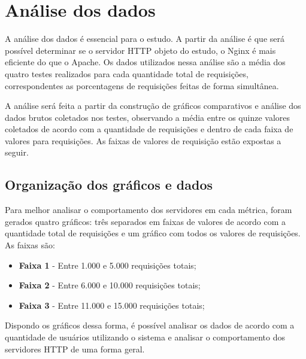 \chapter{Análise dos dados}\label{cap:analise-dos-dados}

A análise dos dados é essencial para o estudo. A partir da análise é que 
será possível determinar se o servidor HTTP objeto do estudo, o Nginx é mais 
eficiente do que o Apache. Os dados utilizados nessa análise são a média dos 
quatro testes realizados para cada quantidade total de requisições, 
correspondentes as porcentagens de requisições feitas de forma simultânea.

A análise será feita a partir da construção de gráficos comparativos e análise 
dos dados brutos coletados nos testes, observando a média 
entre os quinze valores coletados de acordo com a quantidade de requisições e 
dentro de cada faixa de valores para requisições. As faixas de valores de 
requisição estão expostas a seguir.

\section{Organização dos gráficos e dados}

Para melhor analisar o comportamento dos servidores em cada métrica, foram 
gerados quatro gráficos: três separados em faixas de valores de acordo com a 
quantidade total de requisições e um gráfico com todos os valores 
de requisições. As faixas são:

\begin{itemize}
	\item \textbf{Faixa 1} - Entre 1.000 e 5.000 requisições totais;
	\item \textbf{Faixa 2} - Entre 6.000 e 10.000 requisições totais;
	\item \textbf{Faixa 3} - Entre 11.000 e 15.000 requisições totais;
\end{itemize}

Dispondo os gráficos dessa forma, é possível analisar os dados de acordo com 
a quantidade de usuários utilizando o sistema e analisar o comportamento dos 
servidores HTTP de uma forma geral.



%
